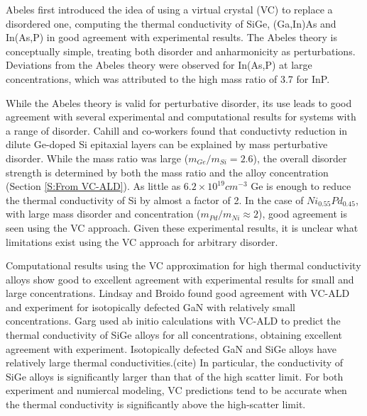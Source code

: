 \documentclass[aps,prb,twocolumn,superscriptaddress,amsmath,amssymb,floatfix]{revtex4}
\begin{document}
Abeles first introduced the idea of using a virtual crystal (VC) to 
replace a disordered one, computing the
thermal conductivity of SiGe, (Ga,In)As and In(As,P) in good agreement 
with experimental results. The Abeles theory is conceptually simple,  
treating both
disorder and anharmonicity as perturbations.\cite{abeles_lattice_1963} 
Deviations from the Abeles theory 
were observed for In(As,P) at large concentrations, which was attributed 
to the high mass ratio of 3.7 for InP.
\cite{abeles_lattice_1963}

While the Abeles theory is valid for 
perturbative disorder, its use leads to good agreement with
several experimental and computational results for systems with 
a range of disorder. 
Cahill and co-workers found that conductivty reduction in dilute 
Ge-doped Si epitaxial layers 
can be explained by mass perturbative disorder.
\cite{cahill_thermal_2004,cahill_thermal_2005} 
While the mass ratio was large ($m_{Ge}/m_{Si} = 2.6$),  
the overall disorder strength is determined by both the mass ratio and 
the alloy concentration (Section \ref{S:From VC-ALD}). 
As little as $6.2\times10^{19} cm^{-3}$ Ge  
is enough to reduce the thermal conductivity of 
Si by almost a factor of 2.\cite{cahill_thermal_2004}
In the
case of $Ni_{0.55}Pd_{0.45}$, with large mass disorder and 
concentration ($m_{Pd}/m_{Ni} \approx 2$), 
good agreement is seen using the VC approach.
\cite{kamitakahara_vibrations_1974} 
Given these experimental results, it is unclear what limitations exist 
using the VC approach for arbitrary disorder.

Computational results using the VC approximation 
for high thermal conductivity 
alloys show good to excellent agreement with experimental results for 
small and large concentrations.
\cite{garg_role_2011,lindsay_thermal_2012} 
Lindsay and Broido 
found good agreement with VC-ALD and experiment for 
isotopically defected GaN with relatively small concentrations.
\cite{lindsay_thermal_2012}  
Garg used ab initio calculations with VC-ALD   
to predict the thermal conductivity of SiGe alloys 
for all concentrations, obtaining excellent agreement with experiment.
\cite{garg_role_2011}  
Isotopically defected GaN and SiGe alloys have relatively large 
thermal conductivities.(cite) In 
particular, the conductivity of SiGe alloys is significantly 
larger than that of the high scatter limit.\cite{cahill_lattice_1988}  
For both experiment and numiercal modeling, VC predictions tend 
to be accurate when the thermal conductivity is significantly above 
the high-scatter limit.
\cite{abeles_lattice_1963,kamitakahara_vibrations_1974,
cahill_thermal_2004,cahill_thermal_2005,
cahill_lattice_1988,garg_role_2011,lindsay_thermal_2012} 
\end{document}
